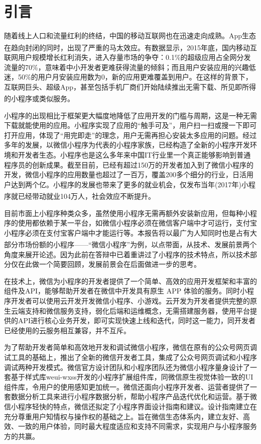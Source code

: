 \documentclass{article}
\begin{document}
\section{引言}
随着线上人口和流量红利的终结，中国的移动互联网也在迅速走向成熟。App生态在趋向封闭的同时，出现了严重的马太效应\textsuperscript{\citep{matai1}}。有数据显示，2015年底，国内移动互联网用户规模增长红利消失，进入存量市场的争夺：0.1\%的超级应用占全网分发流量的70\%，意味着中小开发者更难获得流量的倾斜；而且用户安装应用的兴趣低迷，50\%的用户月安装应用数为0，新的应用更难覆盖到用户。在这样的背景下，互联网巨头、超级App，甚至包括手机厂商们开始陆续推出无需下载、所见即所得的小程序或类似服务。\textsuperscript{\citep{caibao}}\par
小程序的出现相比于框架更大幅度地降低了应用开发的门槛与周期，这是一种无需下载就能使用的应用。小程序实现了应用的“触手可及”，用户扫一扫或搜一下即可打开应用，体现了“用完即走”的理念，用户无需再担心安装太多应用的问题。经过多年的发展，以微信小程序为代表的小程序家族，已经构造了全新的小程序开发环境和开发者生态。小程序也是这么多年来中国IT行业里一个真正能够影响到普通程序员的创新成果。截至目前，已经有超过150万的开发者加入到了微信小程序的开发，微信小程序的应用数量也超过了一百万，覆盖200多个细分的行业，日活用户达到两个亿。小程序的发展也带来了更多的就业机会，仅发布当年(2017年)小程序就已经带动就业104万人，社会效应不断提升。\textsuperscript{\citep{xcxnumbers}}\par
目前市面上小程序种类众多，虽然使用小程序无需再额外安装新应用，但每种小程序的使用都依赖于某一平台，如微信小程序必须在微信客户端中才可运行，支付宝小程序必须在支付宝客户端中才能运行等。本报告将以最广为人知同时也是占有大部分市场份额\textsuperscript{\citep{xcxfenlei}}的小程序——“微信小程序”为例，以点带面，从技术、发展前景两个角度来展开论述。因为此前在答辩中已着重讲过了小程序的技术特点，所以技术部分仅在此做一个简要回顾，发展前景会在后面做进一步的思考。\par
在技术上，微信为小程序的开发者提供了一个简单、高效的应用开发框架和丰富的组件及API，能够帮助开发者在微信中开发具有原生 APP 体验的服务。同时小程序开发者可以使用云开发开发微信小程序、小游戏。云开发为开发者提供完整的原生云端支持和微信服务支持，弱化后端和运维概念，无需搭建服务器，使用平台提供的API进行核心业务开发，即可实现快速上线和迭代，同时这一能力，同开发者已经使用的云服务相互兼容，并不互斥。\par
为了帮助开发者简单和高效地开发和调试微信小程序，微信在原有的公众号网页调试工具的基础上，推出了全新的微信开发者工具，集成了公众号网页调试和小程序调试两种开发模式。微信官方设计团队和小程序团队还为微信小程序量身设计了一套基于样式库weui-wxss开发的小程序扩展组件库，同微信原生视觉体验一致的UI组件库，令用户的使用感知更加统一。微信还面向小程序开发者、运营者提供了一套数据分析工具来进行小程序数据分析，帮助小程序产品迭代优化和运营。基于微信小程序轻快的特点，微信还拟定了小程序界面设计指南和建议。设计指南建立在充分尊重用户知情权与操作权的基础之上。旨在微信生态体系内，建立友好、高效、一致的用户体验，同时最大程度适应和支持不同需求，实现用户与小程序服务方的共赢。\par
\end{document}
